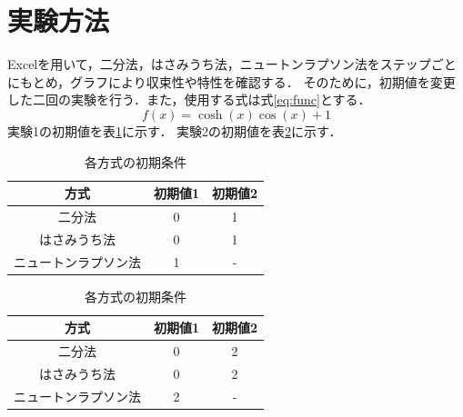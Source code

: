 \documentclass[a4paper,11pt]{ltjsarticle}
\begin{document}
\section{実験方法}
Excelを用いて，二分法，はさみうち法，ニュートンラプソン法をステップごとにもとめ，グラフにより収束性や特性を確認する．
そのために，初期値を変更した二回の実験を行う．また，使用する式は式\eqref{eq:func}とする．
\begin{equation}
    f(x) = \cosh(x)\cos(x) + 1
    \label{eq:func}
\end{equation}
実験1の初期値を表\ref{tab:init1}に示す．
実験2の初期値を表\ref{tab:init2}に示す．
\begin{table}[H]
    \centering
    \caption{各方式の初期条件}
    \begin{tabular}{|c|c|c|}
        \hline
        方式         & 初期値1 & 初期値2 \\ \hline
        二分法        & 0    & 1    \\ \hline
        はさみうち法     & 0    & 1    \\ \hline
        ニュートンラプソン法 & 1    & -    \\ \hline
    \end{tabular}
    \label{tab:init1}
\end{table}
\begin{table}[H]
    \centering
    \caption{各方式の初期条件}
    \begin{tabular}{|c|c|c|}
        \hline
        方式         & 初期値1 & 初期値2 \\ \hline
        二分法        & 0    & 2    \\ \hline
        はさみうち法     & 0    & 2    \\ \hline
        ニュートンラプソン法 & 2    & -    \\ \hline
    \end{tabular}
    \label{tab:init2}
\end{table}
\end{document}
